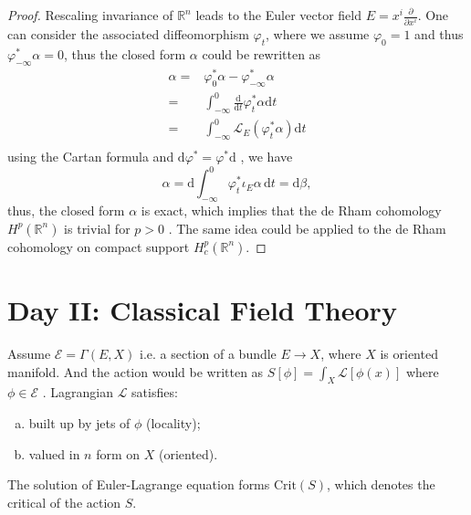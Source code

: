 \documentclass[10pt]{article}
\begin{document}
\begin{proof}
  Rescaling invariance of $ \mathbb{R}^{n}$ leads to the Euler vector field $ E = x^{i} \frac{\partial }{\partial x^{i}}$. One can consider the associated diffeomorphism $ \varphi_{t}$, where we assume $ \varphi_{0} = 1$ and thus $ \varphi^{*}_{-\infty } \alpha = 0$, thus the closed form $ \alpha$ could be rewritten as
  \begin{equation*}
    \begin{aligned}
      \alpha = & \varphi^*_{0} \alpha - \varphi^*_{-\infty } \alpha \\
      = & \int_{-\infty }^{0} \frac{\mathrm{d} }{\mathrm{d} t} \varphi_{t}^{*} \alpha \mathrm{d} t \\
      = & \int_{-\infty }^{0} \mathcal{L}_{E} (\varphi^{*}_{t} \alpha )\mathrm{d} t \\
    \end{aligned}
  \end{equation*}
  using the Cartan formula and $ \mathrm{d} \varphi^{*} = \varphi^{*} \mathrm{d} $ , we have
  \begin{equation*}
    \alpha = \mathrm{d} \int_{-\infty }^{0} \varphi^{*}_{t} \iota_{E} \alpha \, \mathrm{d} t = \mathrm{d} \beta,
  \end{equation*}
  thus, the closed form $ \alpha$ is exact, which implies that the de Rham cohomology $ H^{p}(\mathbb{R}^{n})$ is trivial for $ p>0$ . The same idea could be applied to the de Rham cohomology on compact support $ H^{p}_{c}(\mathbb{R}^{n})$.
\end{proof}

\section{Day II: Classical Field Theory}

Assume $ \mathcal{E} = \Gamma(E,X)$ i.e. a section of a bundle $ E \rightarrow X$, where $ X$ is oriented manifold.
And the action would be written as $ S[\phi] = \int _{X} \mathcal{L}[\phi(x)]$ where $ \phi \in \mathcal{E}$ .
Lagrangian $ \mathcal{L}$ satisfies:
\begin{enumerate}[(a)]
  \item built up by jets of $ \phi$ (locality);
  \item valued in $ n$ form on $ X$ (oriented).
\end{enumerate}
The solution of Euler-Lagrange equation forms $ \mathrm{Crit}(S)$, which denotes the critical of the action $S$.
\end{document}
